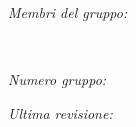 \begin{titlepage}
\begin{minipage}{0.4\textwidth}
\begin{flushleft}
\large
\textit{Membri del gruppo:}\\
\@author %
\end{flushleft}
\end{minipage}
~
\begin{minipage}{0.4\textwidth}
\begin{flushright}
\large
\textit{Numero gruppo: }
\groupNumber
\end{flushright}
\end{minipage}



\vfill\vfill
\textit{Ultima revisione:}
{\@date}

\end{titlepage}